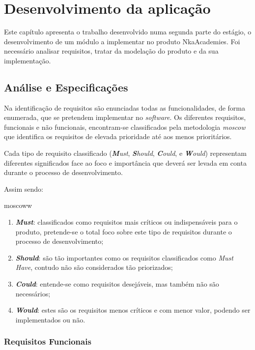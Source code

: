 
\chapter{Desenvolvimento da aplicação}

Este capítulo apresenta o trabalho desenvolvido numa segunda parte do estágio, o desenvolvimento de um módulo a implementar no produto NkaAcademies. Foi necessário analisar requisitos, tratar da modelação do produto e da sua implementação.

\section{Análise e Especificações}

Na identificação de requisitos são enunciadas todas as funcionalidades, de forma enumerada, que se pretendem implementar no \textit{software}.
Os diferentes requisitos, funcionais e não funcionais, encontram-se classificados pela metodologia \textit{\acrshort{moscow}} que identifica os requisitos de elevada prioridade até aos menos prioritários.

Cada tipo de requisito classificado (\textit{\textbf{M}ust}, \textit{\textbf{S}hould}, \textit{\textbf{C}ould}, e \textit{\textbf{W}ould}) representam diferentes significados face ao foco e importância que deverá ser levada em conta durante o processo de desenvolvimento.

Assim sendo:

\gls{moscoww}

\begin{enumerate}
  \item \textbf{\textit{Must}}: classificados como requisitos mais críticos ou indispensáveis para o produto, pretende-se o total foco sobre este tipo de requisitos durante o processo de desenvolvimento;
  \item \textbf{\textit{Should}}: são tão importantes como os requisitos classificados como \textit{Must Have}, contudo não são considerados tão priorizados;
  \item \textbf{\textit{Could}}: entende-se como requisitos desejáveis, mas também não são necessários;
  \item \textbf{\textit{Would}}: estes são os requisitos menos críticos e com menor valor, podendo ser implementados ou não.
\end{enumerate}

\subsection{Requisitos Funcionais}

